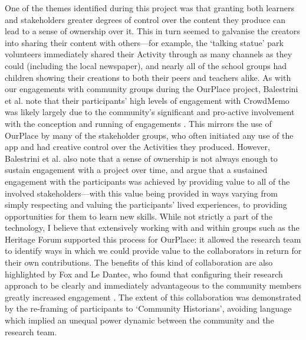 One of the themes identified during this project was that granting both learners and stakeholders greater degrees of control over the content they produce can lead to a sense of ownership over it. This in turn seemed to galvanise the creators into sharing their content with others---for example, the `talking statue' park volunteers immediately shared their Activity through as many channels as they could (including the local newspaper), and nearly all of the school groups had children showing their creations to both their peers and teachers alike. As with our engagements with community groups during the OurPlace project, Balestrini et al. note that their participants' high levels of engagement with CrowdMemo was likely largely due to the community's significant and pro-active involvement with the conception and running of engagements \citep{Balestrini2014}. This mirrors the use of OurPlace by many of the stakeholder groups, who often initiated any use of the app and had creative control over the Activities they produced. However, Balestrini et al. also note that a sense of ownership is not always enough to sustain engagement with a project over time, and argue that a sustained engagement with the participants was achieved by providing value to all of the involved stakeholders---with this value being provided in ways varying from simply respecting and valuing the participants' lived experiences, to providing opportunities for them to learn new skills. While not strictly a part of the technology, I believe that extensively working with and within groups such as the Heritage Forum supported this process for OurPlace: it allowed the research team to identify ways in which we could provide value to the collaborators in return for their own contributions. The benefits of this kind of collaboration are also highlighted by Fox and Le Dantec, who found that configuring their research approach to be clearly and immediately advantageous to the community members greatly increased engagement \citep{Fox2014}. The extent of this collaboration was demonstrated by the re-framing of participants to `Community Historians', avoiding language which implied an unequal power dynamic between the community and the research team.


